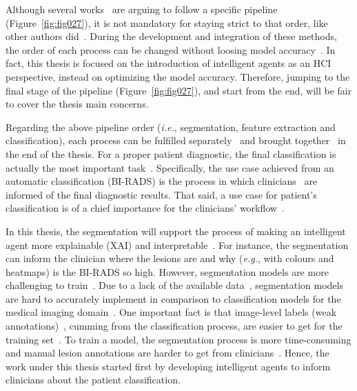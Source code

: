 Although several works~\cite{sharma2020model, 9247957} are arguing to follow a specific pipeline (Figure~\ref{fig:fig027}), it is not mandatory for staying strict to that order, like other authors did~\cite{8451510, AGRAWAL201927}.
During the development and integration of these methods, the order of each process can be changed without loosing model accuracy~\cite{8462671}.
In fact, this thesis is focused on the introduction of intelligent agents as an \ac{HCI} perspective, instead on optimizing the model accuracy.
Therefore, jumping to the final stage of the pipeline (Figure~\ref{fig:fig027}), and start from the end, will be fair to cover the thesis main concerns.

Regarding the above pipeline order ({\it i.e.}, segmentation, feature extraction and classification), each process can be fulfilled separately~\cite{8451510, AGRAWAL201927} and brought together~\cite{10.1007/978-3-030-00934-2_99} in the end of the thesis.
For a proper patient diagnostic, the final classification is actually the most important task~\cite{BHARDWAJ20154611}.
Specifically, the use case achieved from an automatic classification (\ac{BI-RADS}) is the process in which clinicians~\cite{goldenberg2011computer} are informed of the final diagnostic results.
That said, a use case for patient's classification is of a chief importance for the clinicians' workflow~\cite{10.1117/12.2081576}.

In this thesis, the segmentation will support the process of making an intelligent agent more explainable (\ac{XAI}) and interpretable~\cite{8622433}.
For instance, the segmentation can inform the clinician where the lesions are and why ({\it e.g.}, with colours and heatmaps) is the \ac{BI-RADS} so high.
However, segmentation models are more challenging to train~\cite{hesamian2019deep}.
Due to a lack of the available data~\cite{ahmed2020images}, segmentation models are hard to accurately implement in comparison to classification models for the medical imaging domain~\cite{murtaza2019deep}.
One important fact is that image-level labels (weak annotations)~\cite{10.1145/3373017.3373051}, cumming from the classification process, are easier to get for the training set~\cite{TAJBAKHSH2020101693}.
To train a model, the segmentation process is more time-consuming and manual lesion annotations are harder to get from clinicians~\cite{10.1007/978-3-030-59719-1_44}.
Hence, the work under this thesis started first by developing intelligent agents to inform clinicians about the patient classification.

